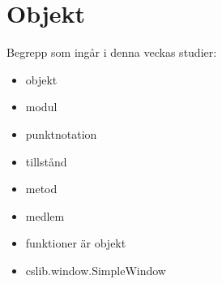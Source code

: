 \chapter{Objekt}\label{chapter:W04}
Begrepp som ingår i denna veckas studier:
\begin{itemize}[noitemsep,label={$\square$},leftmargin=*]
\item objekt
\item modul
\item punktnotation
\item tillstånd
\item metod
\item medlem
\item funktioner är objekt
\item cslib.window.SimpleWindow\end{itemize}
